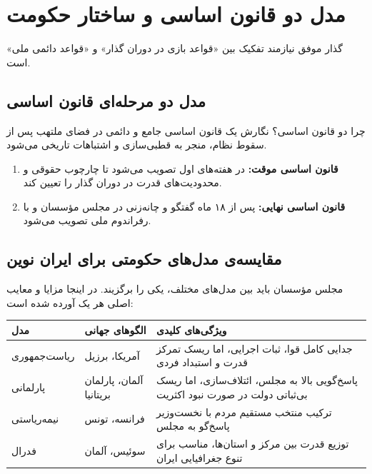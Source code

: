 \chapter{مدل دو قانون اساسی و ساختار حکومت}
\label{app:constitution}

گذار موفق نیازمند تفکیک بین «قواعد بازی در دوران گذار» و «قواعد دائمی ملی» است.

\section{مدل دو مرحله‌ای قانون اساسی}

\begin{modernbox}{چرا دو قانون اساسی؟}
نگارش یک قانون اساسی جامع و دائمی در فضای ملتهب پس از سقوط نظام، منجر به قطبی‌سازی و اشتباهات تاریخی می‌شود.
\begin{enumerate}
    \item \textbf{قانون اساسی موقت:} در هفته‌های اول تصویب می‌شود تا چارچوب حقوقی و محدودیت‌های قدرت در دوران گذار را تعیین کند.
    \item \textbf{قانون اساسی نهایی:} پس از ۱۸ ماه گفتگو و چانه‌زنی در مجلس مؤسسان و با رفراندوم ملی تصویب می‌شود.
\end{enumerate}
\end{modernbox}

\section{مقایسه‌ی مدل‌های حکومتی برای ایران نوین}

مجلس مؤسسان باید بین مدل‌های مختلف، یکی را برگزیند. در اینجا مزایا و معایب اصلی هر یک آورده شده است:

\begin{center}
\begin{tabular}{R{4cm} R{4cm} L{6cm}}
\hline
\textbf{مدل} & \textbf{الگوهای جهانی} & \textbf{ویژگی‌های کلیدی} \\
\hline
ریاست‌جمهوری & آمریکا، برزیل & جدایی کامل قوا، ثبات اجرایی، اما ریسک تمرکز قدرت و استبداد فردی \\
پارلمانی & آلمان، پارلمان بریتانیا & پاسخ‌گویی بالا به مجلس، ائتلاف‌سازی، اما ریسک بی‌ثباتی دولت در صورت نبود اکثریت \\
نیمه‌ریاستی & فرانسه، تونس & ترکیب منتخب مستقیم مردم با نخست‌وزیر پاسخ‌گو به مجلس \\
فدرال & سوئیس، آلمان & توزیع قدرت بین مرکز و استان‌ها، مناسب برای تنوع جغرافیایی ایران \\
\hline
\end{tabular}
\end{center}

